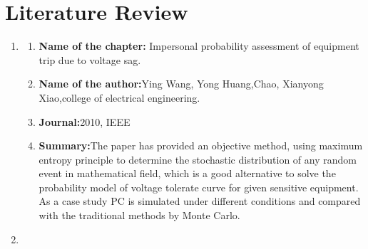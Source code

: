 \documentclass[14pt, a4paper]{extreport}
\begin{document}
		\chapter[Literature Review]{Literature Review}
			\begin{enumerate}
\item 
    \begin{enumerate}
        \item{\textbf{Name of the chapter:}} Impersonal probability assessment of equipment trip due to voltage sag. 

       \item{\textbf{Name of the author:}}Ying Wang, Yong Huang,Chao, Xianyong Xiao,college of electrical engineering. \linebreak
        
         \item{\textbf{Journal:}}2010, IEEE
        \item{\textbf{Summary:}}The paper has provided
an objective method,
using maximum entropy
principle to determine the
stochastic distribution of
any random event in
mathematical field, which
is a good alternative to
solve the probability
model of voltage tolerate
curve for given sensitive
equipment. As a case
study PC is simulated
under different conditions
and compared with the
traditional methods by
Monte Carlo.
\end{enumerate}
        
        \item 
        
        \begin{enumerate}
            

\end{enumerate}
\end{enumerate}
\end{document}
